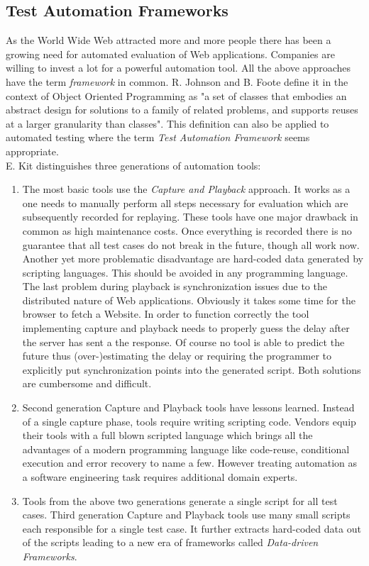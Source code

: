 \documentclass[12pt, notitlepage]{article}
\begin{document}
\subsection{Test Automation Frameworks}
As the World Wide Web attracted more and more people there has been a growing need for automated evaluation of Web applications. Companies are willing to
invest a lot for a powerful automation tool. All the above approaches have the term \textit{framework} in common. R. Johnson and B. Foote define it
in the context of Object Oriented Programming\cite{oop} as
"a set of classes that embodies an abstract design for solutions to a family of related problems, and supports reuses at a larger granularity than classes".
This definition can also be applied to automated testing where the term \textit{Test Automation Framework} seems appropriate.\\
E. Kit\cite{kit} distinguishes three generations of automation tools:
\begin{enumerate}
	\item The most basic tools use the \textit{Capture and Playback} approach. It works as a one needs to manually perform all steps necessary for evaluation which
	are subsequently recorded for replaying.
	These tools have one major drawback in common as high maintenance costs\cite{record-playback}. Once everything is recorded there is no guarantee that all
	test cases do not break in the future, though all work now. Another yet more problematic disadvantage are hard-coded data generated by
	scripting languages. This should be avoided in any programming language\cite{automation-principles}. 
	The last problem during playback is synchronization issues due to the distributed nature of Web applications. Obviously it takes some time for the browser to
	fetch a Website. In order to function correctly the tool implementing capture and playback needs to properly guess the delay after the server has sent a the response.
	Of course no tool is able to predict the future thus (over-)estimating the delay or requiring the programmer to explicitly put synchronization points
	into the generated script. Both solutions are cumbersome and difficult.
	\item Second generation Capture and Playback tools have lessons learned. Instead of a single capture phase, tools require writing scripting code. Vendors 
	equip their tools with a full blown scripted language which brings all the advantages of a modern programming language like code-reuse, conditional execution and
	error recovery to name a few. However treating automation as a software engineering task requires additional domain experts.
	\item Tools from the above two generations generate a single script for all test cases. Third generation Capture and Playback tools use many small scripts each 
	responsible for a single test case. It further extracts hard-coded data out of the scripts leading to a new era of frameworks called
	\textit{Data-driven Frameworks}. 
\end{enumerate} 
\end{document}
